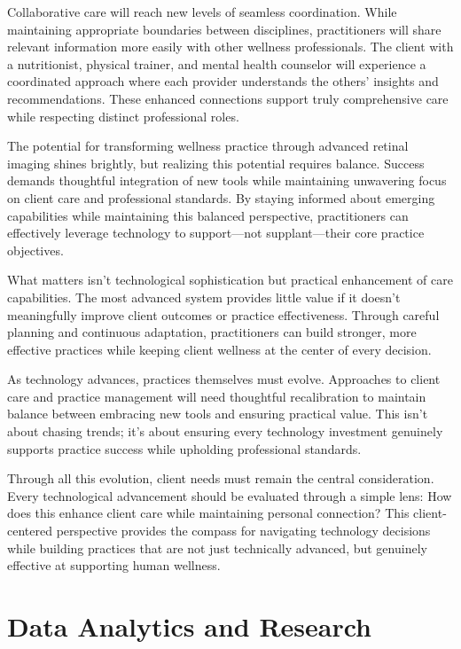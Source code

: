 \documentclass[
  Letterpaper,
]{scrbook}
\begin{document}
Collaborative care will reach new levels of seamless coordination. While
maintaining appropriate boundaries between disciplines, practitioners
will share relevant information more easily with other wellness
professionals. The client with a nutritionist, physical trainer, and
mental health counselor will experience a coordinated approach where
each provider understands the others' insights and recommendations.
These enhanced connections support truly comprehensive care while
respecting distinct professional roles.

The potential for transforming wellness practice through advanced
retinal imaging shines brightly, but realizing this potential requires
balance. Success demands thoughtful integration of new tools while
maintaining unwavering focus on client care and professional standards.
By staying informed about emerging capabilities while maintaining this
balanced perspective, practitioners can effectively leverage technology
to support---not supplant---their core practice objectives.

What matters isn't technological sophistication but practical
enhancement of care capabilities. The most advanced system provides
little value if it doesn't meaningfully improve client outcomes or
practice effectiveness. Through careful planning and continuous
adaptation, practitioners can build stronger, more effective practices
while keeping client wellness at the center of every decision.

As technology advances, practices themselves must evolve. Approaches to
client care and practice management will need thoughtful recalibration
to maintain balance between embracing new tools and ensuring practical
value. This isn't about chasing trends; it's about ensuring every
technology investment genuinely supports practice success while
upholding professional standards.

Through all this evolution, client needs must remain the central
consideration. Every technological advancement should be evaluated
through a simple lens: How does this enhance client care while
maintaining personal connection? This client-centered perspective
provides the compass for navigating technology decisions while building
practices that are not just technically advanced, but genuinely
effective at supporting human wellness.

\section{Data Analytics and Research}\label{data-analytics-and-research}
\end{document}
